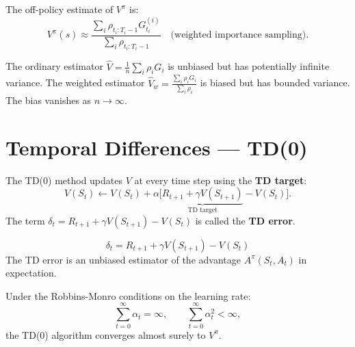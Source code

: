 \begin{keyformulas}[title=\textbf{Off-Policy MC Estimator}]
The off-policy estimate of $V^\pi$ is:
\[
    V^\pi(s) \approx \frac{\sum_{i} \rho_{t_i:T_i-1} G_{t_i}^{(i)}}
    {\sum_{i} \rho_{t_i:T_i-1}}
    \quad \text{(weighted importance sampling)}.
\]
\end{keyformulas}

\begin{proposition}
The ordinary estimator $\hat{V} = \frac{1}{n}\sum_i \rho_i G_i$ is unbiased
but has potentially infinite variance. The weighted estimator
$\hat{V}_w = \frac{\sum_i \rho_i G_i}{\sum_i \rho_i}$ is biased but has
bounded variance. The bias vanishes as $n \to \infty$.
\end{proposition}

\section{Temporal Differences --- TD(0)}

\begin{definition}[TD(0) Update]
The TD(0) method updates $V$ at every time step using the \textbf{TD target}:
\[
    V(S_t) \leftarrow V(S_t) + \alpha \big[ \underbrace{R_{t+1} + \gamma V(S_{t+1})}_{\text{TD target}} - V(S_t) \big].
\]
The term $\delta_t = R_{t+1} + \gamma V(S_{t+1}) - V(S_t)$ is called the
\textbf{TD error}.
\end{definition}

\begin{keyformulas}[title=\textbf{Temporal Difference Error}]
\[
    \delta_t = R_{t+1} + \gamma V(S_{t+1}) - V(S_t)
\]
The TD error is an unbiased estimator of the advantage $A^\pi(S_t, A_t)$ in
expectation.
\end{keyformulas}

\begin{theorem}[Convergence of TD(0)]
Under the Robbins-Monro conditions on the learning rate:
\[
    \sum_{t=0}^{\infty} \alpha_t = \infty, \qquad
    \sum_{t=0}^{\infty} \alpha_t^2 < \infty,
\]
the TD(0) algorithm converges almost surely to $V^\pi$.
\end{theorem}

